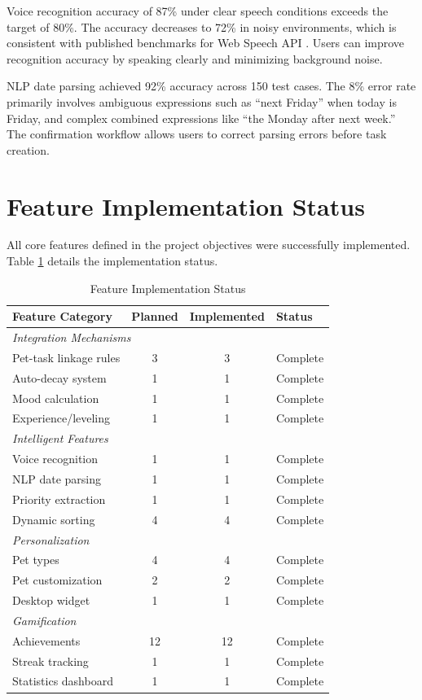 Voice recognition accuracy of 87\% under clear speech conditions exceeds the target of 80\%. The accuracy decreases to 72\% in noisy environments, which is consistent with published benchmarks for Web Speech API \citationneeded. Users can improve recognition accuracy by speaking clearly and minimizing background noise.

NLP date parsing achieved 92\% accuracy across 150 test cases. The 8\% error rate primarily involves ambiguous expressions such as ``next Friday'' when today is Friday, and complex combined expressions like ``the Monday after next week.'' The confirmation workflow allows users to correct parsing errors before task creation.

\section{Feature Implementation Status}
\label{sec:feature-status}

\completed

All core features defined in the project objectives were successfully implemented. Table \ref{tab:feature-status} details the implementation status.

\begin{table}[htbp]
\centering
\caption{Feature Implementation Status}
\label{tab:feature-status}
\begin{tabular}{@{}lccl@{}}
\toprule
\textbf{Feature Category} & \textbf{Planned} & \textbf{Implemented} & \textbf{Status} \\
\midrule
\multicolumn{4}{l}{\textit{Integration Mechanisms}} \\
Pet-task linkage rules & 3 & 3 & Complete \\
Auto-decay system & 1 & 1 & Complete \\
Mood calculation & 1 & 1 & Complete \\
Experience/leveling & 1 & 1 & Complete \\
\midrule
\multicolumn{4}{l}{\textit{Intelligent Features}} \\
Voice recognition & 1 & 1 & Complete \\
NLP date parsing & 1 & 1 & Complete \\
Priority extraction & 1 & 1 & Complete \\
Dynamic sorting & 4 & 4 & Complete \\
\midrule
\multicolumn{4}{l}{\textit{Personalization}} \\
Pet types & 4 & 4 & Complete \\
Pet customization & 2 & 2 & Complete \\
Desktop widget & 1 & 1 & Complete \\
\midrule
\multicolumn{4}{l}{\textit{Gamification}} \\
Achievements & 12 & 12 & Complete \\
Streak tracking & 1 & 1 & Complete \\
Statistics dashboard & 1 & 1 & Complete \\
\bottomrule
\end{tabular}
\end{table}

